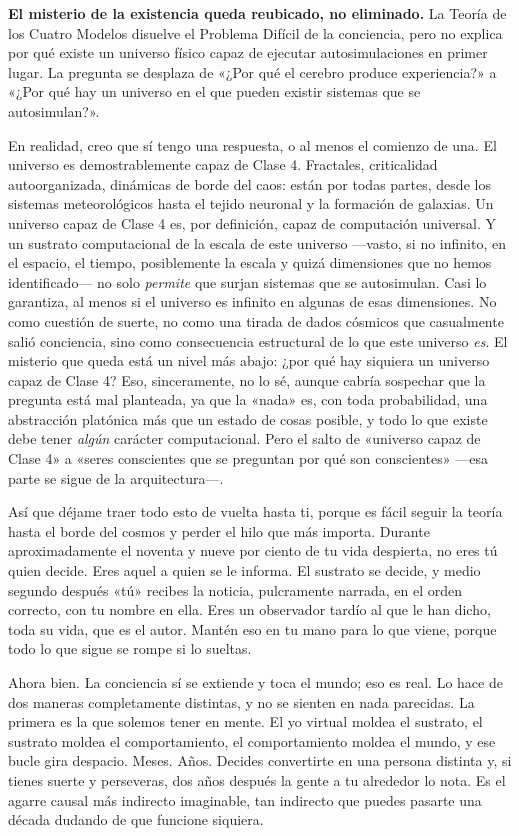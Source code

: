 \documentclass[11pt, twoside, openright]{book}
\begin{document}
\textbf{El misterio de la existencia queda reubicado, no eliminado.} La Teoría de los Cuatro Modelos disuelve el Problema Difícil de la conciencia, pero no explica por qué existe un universo físico capaz de ejecutar autosimulaciones en primer lugar. La pregunta se desplaza de «¿Por qué el cerebro produce experiencia?» a «¿Por qué hay un universo en el que pueden existir sistemas que se autosimulan?».

En realidad, creo que sí tengo una respuesta, o al menos el comienzo de una. El universo es demostrablemente capaz de Clase 4. Fractales, criticalidad autoorganizada, dinámicas de borde del caos: están por todas partes, desde los sistemas meteorológicos hasta el tejido neuronal y la formación de galaxias. Un universo capaz de Clase 4 es, por definición, capaz de computación universal. Y un sustrato computacional de la escala de este universo ---vasto, si no infinito, en el espacio, el tiempo, posiblemente la escala y quizá dimensiones que no hemos identificado--- no solo \textit{permite} que surjan sistemas que se autosimulan. Casi lo garantiza, al menos si el universo es infinito en algunas de esas dimensiones. No como cuestión de suerte, no como una tirada de dados cósmicos que casualmente salió conciencia, sino como consecuencia estructural de lo que este universo \textit{es}. El misterio que queda está un nivel más abajo: ¿por qué hay siquiera un universo capaz de Clase 4? Eso, sinceramente, no lo sé, aunque cabría sospechar que la pregunta está mal planteada, ya que la «nada» es, con toda probabilidad, una abstracción platónica más que un estado de cosas posible, y todo lo que existe debe tener \textit{algún} carácter computacional. Pero el salto de «universo capaz de Clase 4» a «seres conscientes que se preguntan por qué son conscientes» ---esa parte se sigue de la arquitectura---.

Así que déjame traer todo esto de vuelta hasta ti, porque es fácil seguir la teoría hasta el borde del cosmos y perder el hilo que más importa. Durante aproximadamente el noventa y nueve por ciento de tu vida despierta, no eres tú quien decide. Eres aquel a quien se le informa. El sustrato se decide, y medio segundo después «tú» recibes la noticia, pulcramente narrada, en el orden correcto, con tu nombre en ella. Eres un observador tardío al que le han dicho, toda su vida, que es el autor. Mantén eso en tu mano para lo que viene, porque todo lo que sigue se rompe si lo sueltas.

Ahora bien. La conciencia sí se extiende y toca el mundo; eso es real. Lo hace de dos maneras completamente distintas, y no se sienten en nada parecidas. La primera es la que solemos tener en mente. El yo virtual moldea el sustrato, el sustrato moldea el comportamiento, el comportamiento moldea el mundo, y ese bucle gira despacio. Meses. Años. Decides convertirte en una persona distinta y, si tienes suerte y perseveras, dos años después la gente a tu alrededor lo nota. Es el agarre causal más indirecto imaginable, tan indirecto que puedes pasarte una década dudando de que funcione siquiera.
\end{document}
